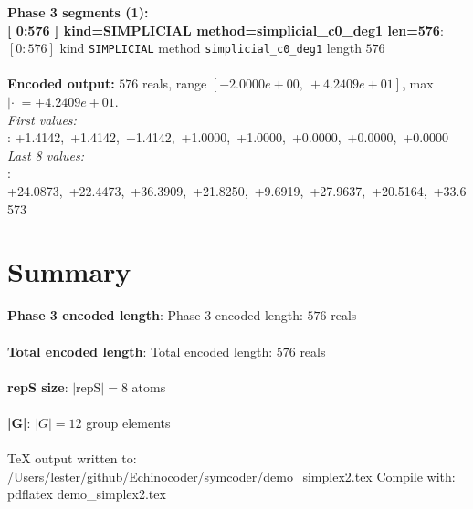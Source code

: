 \documentclass[a4paper,11pt]{article}
\begin{document}
\textbf{Phase 3 segments (1):}\\
\textbf{    [    0:576  ]  kind=SIMPLICIAL  method=simplicial\_c0\_deg1  len=576}: $[0{:}576]$  kind \texttt{SIMPLICIAL}  method \texttt{simplicial\_c0\_deg1}  length $576$\\\\

\textbf{Encoded output:} $576$ reals, range $[-2.0000e+00,\ +4.2409e+01]$, max$|\cdot| = +4.2409e+01$.\\
\textit{First values:}\\
\textbf{    }: +1.4142,\ +1.4142,\ +1.4142,\ +1.0000,\ +1.0000,\ +0.0000,\ +0.0000,\ +0.0000\\
\textit{Last 8 values:}\\
\textbf{    }: +24.0873,\ +22.4473,\ +36.3909,\ +21.8250,\ +9.6919,\ +27.9637,\ +20.5164,\ +33.6573\\

\section{Summary}
\textbf{  Phase 3 encoded length}: Phase 3 encoded length: $576$ reals\\\\
\textbf{  Total encoded length}: Total encoded length: $576$ reals\\\\
\textbf{  repS size}: $|\text{repS}| = 8$ atoms\\\\
\textbf{  |G|}: $|G| = 12$ group elements\\\\

  TeX output written to: /Users/lester/github/Echinocoder/symcoder/demo\_simplex2.tex
  Compile with:  pdflatex demo\_simplex2.tex
\end{document}
